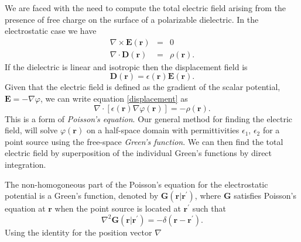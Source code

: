 \documentclass[a4paper, 12pt]{article}
\begin{document}
We are faced with the need to compute the total electric field arising from the presence of free charge on the surface of a polarizable dielectric. In the electrostatic case we have
\begin{eqnarray}
\nabla \times \mathbf{E(r)}&=&0 \\
\nabla \cdot \mathbf{D(r)}&=&\rho(\mathbf{r}).
\end{eqnarray}
If the dielectric is linear and isotropic then the displacement field is 
\begin{equation}\label{displacement}
\mathbf{D(r)} = \epsilon(\mathbf{r})\mathbf{E}(\mathbf{r}).
\end{equation}
Given that the electric field is defined as the gradient of the scalar potential, $\mathbf{E}=-\nabla \varphi $, we can write equation \ref{displacement} as 
\begin{equation}
\nabla \cdot \left[\epsilon(\mathbf{r})\nabla \varphi (\mathbf{r}) \right] = -\rho (\mathbf{r}).
\end{equation}
This is a form of \emph{Poisson's equation}. Our general method for finding the electric field, will solve $\varphi (\mathbf{r})$ on a half-space domain with permittivities $\epsilon_1$, $\epsilon_2$ for a point source using the free-space \emph{Green's function}. We can then find the total electric field by superposition of the individual Green's functions by direct integration.

The non-homogoneous part of the Poisson's equation for the electrostatic potential is a Green's function, denoted by $\mathbf{G}(\mathbf{r} | \mathbf{r^\prime})$, where $\mathbf{G}$ satisfies Poisson's equation at $\mathbf{r}$ when the point source is located at $\mathbf{r^\prime}$ such that
\begin{equation}
\nabla^2 \mathbf{G}(\mathbf{r} | \mathbf{r^\prime}) = -\delta( \mathbf{r} - \mathbf{r^\prime}).
\end{equation}
Using the identity for the position vector $\nabla$
\end{document}
